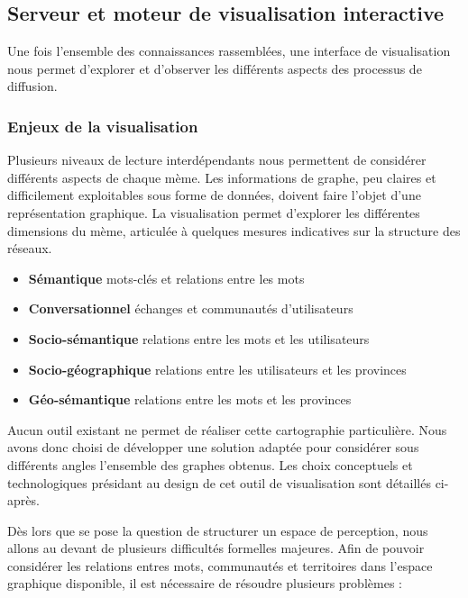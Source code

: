 \subsection{Serveur et moteur de visualisation interactive}


Une fois l'ensemble des connaissances rassemblées, une interface de visualisation nous permet d'explorer et d'observer les différents aspects des processus de diffusion.

\subsubsection{Enjeux de la visualisation} %
\label{ssub:enjeux_de_la_visualisation}

Plusieurs niveaux de lecture interdépendants nous permettent de considérer différents aspects de chaque mème. Les informations de graphe, peu claires et difficilement exploitables sous forme de données, doivent faire l'objet d'une représentation graphique. La visualisation permet d{\textquoteright}explorer les différentes dimensions du mème, articulée à quelques mesures indicatives sur la structure des réseaux.

\begin{itemize}
    \item \textbf{Sémantique} mots-clés et relations entre les mots
    \item \textbf{Conversationnel} échanges et communautés d{\textquoteright}utilisateurs 
    \item \textbf{Socio-sémantique} relations entre les mots et les utilisateurs
    \item \textbf{Socio-géographique} relations entre les utilisateurs et les provinces
    \item \textbf{Géo-sémantique} relations entre les mots et les provinces
\end{itemize}


Aucun outil existant ne permet de réaliser cette cartographie particulière. Nous avons donc choisi de développer une solution adaptée pour considérer sous différents angles l{\textquoteright}ensemble des graphes obtenus. Les choix conceptuels et technologiques présidant au design de cet outil de visualisation sont détaillés ci-après. 

Dès lors que se pose la question de structurer un espace de perception, nous allons au devant de plusieurs difficultés formelles majeures. Afin de pouvoir considérer les relations entres mots, communautés et territoires dans l{\textquoteright}espace graphique disponible, il est nécessaire de résoudre plusieurs problèmes :

